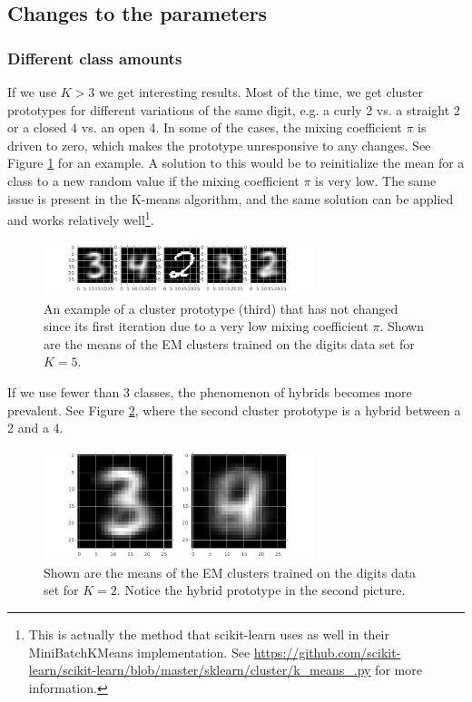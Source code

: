 \documentclass[paper=a4, fontsize=10pt]{scrartcl} %
\numberwithin{equation}{section} %
\numberwithin{figure}{section} %
\numberwithin{table}{section} %
\begin{document}
\subsection{Changes to the parameters}
\subsubsection{Different class amounts}

If we use $K > 3$ we get interesting results. Most of the time, we get cluster prototypes for different variations of the same digit, e.g. a curly 2 vs. a straight 2 or a closed 4 vs. an open 4. In some of the cases, the mixing coefficient $\pi$ is driven to zero, which makes the prototype unresponsive to any changes. See Figure \ref{low_pi} for an example. A solution to this would be to reinitialize the mean for a class to a new random value if the mixing coefficient $\pi$ is very low. The same issue is present in the K-means algorithm, and the same solution can be applied and works relatively well\footnote{This is actually the method that scikit-learn uses as well in their MiniBatchKMeans implementation. See \url{https://github.com/scikit-learn/scikit-learn/blob/master/sklearn/cluster/k\_means\_.py} for more information.}.

\begin{figure}[H]
	\centering
	\includegraphics[width=0.7\textwidth]{bad2.pdf}
	\caption{An example of a cluster prototype (third) that has not changed since its first iteration due to a very low mixing coefficient $\pi$. Shown are the means of the EM clusters trained on the digits data set for $K = 5$.}
	\label{low_pi}
\end{figure}

If we use fewer than 3 classes, the phenomenon of hybrids becomes more prevalent. See Figure \ref{hybrid}, where the second cluster prototype is a hybrid between a 2 and a 4.

\begin{figure}[H]
	\centering
	\includegraphics[width=0.7\textwidth]{hybrid_2.pdf}
	\caption{Shown are the means of the EM clusters trained on the digits data set for $K = 2$. Notice the hybrid prototype in the second picture.}
	\label{hybrid}
\end{figure}
\end{document}
